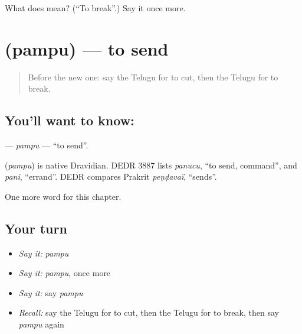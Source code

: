 \begin{tcolorbox}[breakable,colback=teal!4,colframe=teal!35!black,title={Before you move on}]
What does  mean? (\textquotedblleft{}To break\textquotedblright{}.) Say it once more.
\end{tcolorbox}
\section[\texorpdfstring{\te{పంపు} (pampu)}{పంపు (pampu)}]{ (pampu) — to send}

\label{lesson:TE-C144-pampu}



\begin{quote}
Before the new one: say the Telugu for to cut, then the Telugu for to break.
\end{quote}

\subsection*{You'll want to know: }
\textbf{} — \emph{pampu} — \textquotedblleft{}to send\textquotedblright{}.

\begin{cousinweb}
\textbf{} (\emph{pampu}) is native Dravidian. DEDR 3887 lists \emph{panucu}, \textquotedblleft{}to send, command\textquotedblright{}, and \emph{pani}, \textquotedblleft{}errand\textquotedblright{}. DEDR compares Prakrit \emph{peṇḍavaï}, \textquotedblleft{}sends\textquotedblright{}.
\end{cousinweb}

\begin{grammarlens}[title={What you've built}]
One more word for this chapter.
\end{grammarlens}

\subsection*{Your turn}
\begin{itemize}
\raggedright
  \item \emph{Say it:} \emph{pampu}
  \item \emph{Say it:} \emph{pampu}, once more
  \item \emph{Say it:} say \emph{pampu}
  \item \emph{Recall:} say the Telugu for to cut, then the Telugu for to break, then say \emph{pampu} again
\end{itemize}

